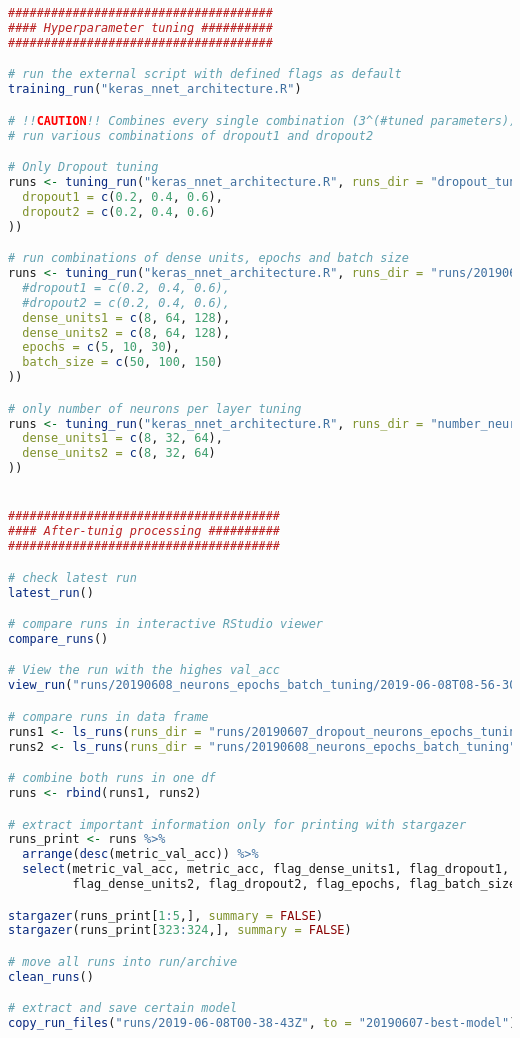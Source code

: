 \begin{lstlisting}[language=R,caption={Hyperparameter tuning routine}, label=lst_tuning]
#####################################
#### Hyperparameter tuning ##########
#####################################

# run the external script with defined flags as default
training_run("keras_nnet_architecture.R")

# !!CAUTION!! Combines every single combination (3^(#tuned parameters)), thus long runtime 
# run various combinations of dropout1 and dropout2

# Only Dropout tuning
runs <- tuning_run("keras_nnet_architecture.R", runs_dir = "dropout_tuning", flags = list(
  dropout1 = c(0.2, 0.4, 0.6),
  dropout2 = c(0.2, 0.4, 0.6)
))

# run combinations of dense units, epochs and batch size
runs <- tuning_run("keras_nnet_architecture.R", runs_dir = "runs/20190608_neurons_epochs_batch_tuning", flags = list(
  #dropout1 = c(0.2, 0.4, 0.6),
  #dropout2 = c(0.2, 0.4, 0.6),
  dense_units1 = c(8, 64, 128),
  dense_units2 = c(8, 64, 128),
  epochs = c(5, 10, 30),
  batch_size = c(50, 100, 150)
))

# only number of neurons per layer tuning
runs <- tuning_run("keras_nnet_architecture.R", runs_dir = "number_neurons_tuning", flags = list(
  dense_units1 = c(8, 32, 64),
  dense_units2 = c(8, 32, 64)
))


######################################
#### After-tunig processing ##########
######################################

# check latest run
latest_run()

# compare runs in interactive RStudio viewer
compare_runs()

# View the run with the highes val_acc
view_run("runs/20190608_neurons_epochs_batch_tuning/2019-06-08T08-56-30Z")

# compare runs in data frame
runs1 <- ls_runs(runs_dir = "runs/20190607_dropout_neurons_epochs_tuning", order = metric_val_acc)
runs2 <- ls_runs(runs_dir = "runs/20190608_neurons_epochs_batch_tuning", order = metric_val_acc)

# combine both runs in one df
runs <- rbind(runs1, runs2)

# extract important information only for printing with stargazer
runs_print <- runs %>%
  arrange(desc(metric_val_acc)) %>% 
  select(metric_val_acc, metric_acc, flag_dense_units1, flag_dropout1,
         flag_dense_units2, flag_dropout2, flag_epochs, flag_batch_size)

stargazer(runs_print[1:5,], summary = FALSE)
stargazer(runs_print[323:324,], summary = FALSE)

# move all runs into run/archive
clean_runs()

# extract and save certain model
copy_run_files("runs/2019-06-08T00-38-43Z", to = "20190607-best-model")
      
\end{lstlisting}